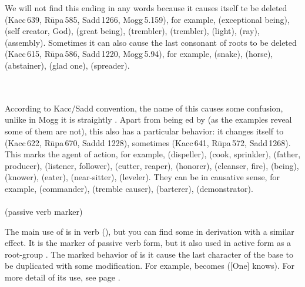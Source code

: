 We will not find this ending in any words because it causes itself te be deleted (Kacc\,639, R\=upa\,585, Sadd\,1266, Mogg\,5.159), for example,  (exceptional being),  (self creator, God),  (great being),  (trembler),  (trembler),  (light),  (ray),  (assembly). Sometimes it can also cause the last consonant of roots to be deleted (Kacc\,615, R\=upa\,586, Sadd\,1220, Mogg\,5.94), for example,  (snake),  (horse),  (abstainer),  (glad one),  (spreader).

\paragraph*{} \ 

According to Kacc/Sadd convention, the name of this  causes some confusion, unlike in Mogg it is straightly . Apart from being ed by  (as the examples reveal some of them are not), this also has a particular behavior: it changes itself to  (Kacc\,622, R\=upa\,670, Saddd 1228), sometimes  (Kacc\,641, R\=upa\,572, Sadd\,1268). This  marks the agent of action, for example,  (dispeller),  (cook, sprinkler),  (father, producer),  (listener, follower),  (cutter, reaper),  (honorer),  (cleanser, fire),  (being),  (knower),  (eater),  (near-sitter),  (leveler). They can be in causative sense, for example,  (commander),  (tremble causer),  (barterer),  (demonstrator).

\paragraph*{} (passive verb marker)

The main use of  is in verb (), but you can find some in derivation with a similar effect. It is the marker of passive verb form, but it also used in active form as a root-group . The marked behavior of  is it cause the last character of the base to be duplicated with some modification. For example,  becomes  ([One] knows). For more detail of its use, see page \pageref{pacca:ya2}. 

